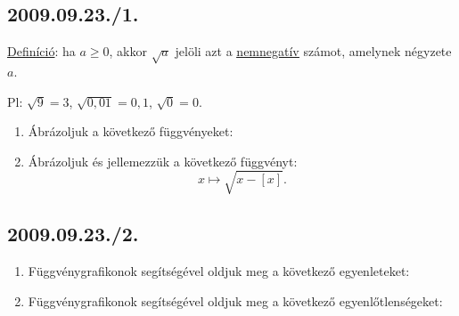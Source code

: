 \subsection*{2009.09.23./1.}
\underline{Definíció}: ha $a\ge 0$, akkor $\sqrt a$ jelöli azt a 
\underline{\underline{nemnegatív}} számot, amelynek négyzete $a$.

Pl: $\sqrt 9 = 3$, $\sqrt{0,01}=0,1$, $\sqrt 0 = 0$.
\begin{enumerate}
\item Ábrázoljuk a következő függvényeket:
\item Ábrázoljuk és jellemezzük a következő függvényt:
$$x\mapsto \sqrt{x-[x]}.$$
\end{enumerate}

\subsection*{2009.09.23./2.}
\begin{enumerate}
\item Függvénygrafikonok segítségével oldjuk meg a következő egyenleteket:
\item Függvénygrafikonok segítségével oldjuk meg a következő egyenlőtlenségeket: 
\end{enumerate}

